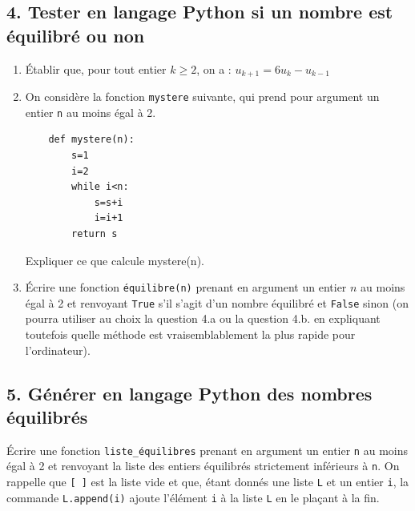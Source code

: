 \subsection*{4. Tester en langage Python si un nombre est équilibré ou non}
\begin{enumerate}
    \item Établir que, pour tout entier \( k \geqslant 2 \), on a : \( u_{k+1} = 6u_k - u_{k-1} \)
    \item On considère la fonction \texttt{mystere} suivante, qui prend pour argument un entier \texttt{n} au moins égal à 2.
    
    \begin{verbatim}
    def mystere(n):
        s=1
        i=2
        while i<n:
            s=s+i
            i=i+1
        return s
    \end{verbatim}
    
    Expliquer ce que calcule mystere(n).
    \item Écrire une fonction \texttt{équilibre(n)} prenant en argument un entier \( n \) au moins égal à 2 et renvoyant \texttt{True} s'il s'agit d'un nombre équilibré et \texttt{False} sinon (on pourra utiliser au choix la question 4.a ou la question 4.b. en expliquant toutefois quelle méthode est vraisemblablement la plus rapide pour l'ordinateur).
\end{enumerate}

\subsection*{5. Générer en langage Python des nombres équilibrés}

Écrire une fonction \texttt{liste\_équilibres} prenant en argument un entier \texttt{n} au moins égal à 2 et renvoyant la liste des entiers équilibrés strictement inférieurs à \texttt{n}. On rappelle que \texttt{[ ]} est la liste vide et que, étant donnés une liste \texttt{L} et un entier \texttt{i}, la commande \texttt{L.append(i)} ajoute l'élément \texttt{i} à la liste \texttt{L} en le plaçant à la fin.
